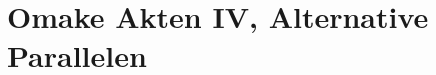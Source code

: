 

\makeatletter
\newcommand{\OmakeIVspecialsection}[2][1.5]{%
\vspace*{2\baselineskip plus 1\baselineskip minus 1\baselineskip}%
\noindent\hfill\scalebox{#1}{#2}\hfill\mbox{}%
\vskip 1\baselineskip plus 1\baselineskip%
\@afterindentfalse\@afterheading
}
\makeatother

\newcommand{\OmakeIVsection}[2][1.5]{%
  \OmakeIVspecialsection[#1]{\MakeUppercase{#2}}}

\chapter{Omake Akten IV, Alternative Parallelen}
%

